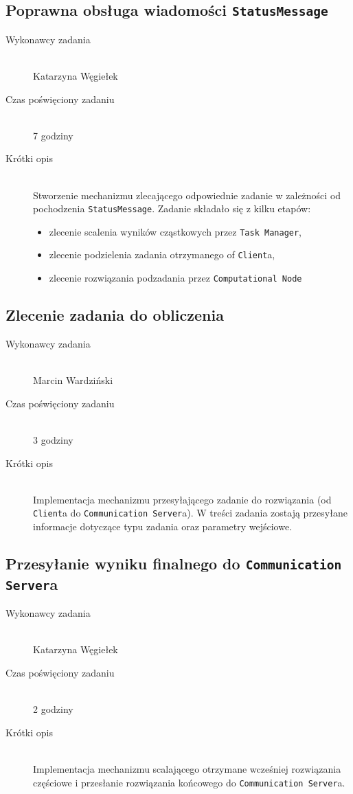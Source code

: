 \documentclass[a4paper]{article}
\begin{document}
\subsection{Poprawna obsługa wiadomości \texttt{StatusMessage}}
\begin{description}
    \item[Wykonawcy zadania] \hfill \\ Katarzyna Węgiełek
    \item[Czas poświęciony zadaniu] \hfill \\ 7 godziny
    \item[Krótki opis] \hfill \\ Stworzenie mechanizmu zlecającego odpowiednie zadanie w zależności od pochodzenia \texttt{StatusMessage}. Zadanie składało się z kilku etapów:
    \begin{itemize}
    	\item zlecenie scalenia wyników cząstkowych przez \texttt{Task Manager},
    	\item zlecenie podzielenia zadania otrzymanego of \texttt{Client}a,
    	\item zlecenie rozwiązania podzadania przez \texttt{Computational Node}
    \end{itemize}
\end{description}

\subsection{Zlecenie zadania do obliczenia}
\begin{description}
    \item[Wykonawcy zadania] \hfill \\ Marcin Wardziński
    \item[Czas poświęciony zadaniu] \hfill \\ 3 godziny
    \item[Krótki opis] \hfill \\ Implementacja mechanizmu przesyłającego zadanie do rozwiązania (od \texttt{Client}a do \texttt{Communication Server}a). W treści zadania zostają przesyłane informacje dotyczące typu zadania oraz parametry wejściowe.
\end{description}

\subsection{Przesyłanie wyniku finalnego do \texttt{Communication Server}a}
\begin{description}
    \item[Wykonawcy zadania] \hfill \\ Katarzyna Węgiełek
    \item[Czas poświęciony zadaniu] \hfill \\ 2 godziny
    \item[Krótki opis] \hfill \\ Implementacja mechanizmu scalającego otrzymane wcześniej rozwiązania częściowe i przesłanie rozwiązania końcowego do \texttt{Communication Server}a.
\end{description}
\end{document}
